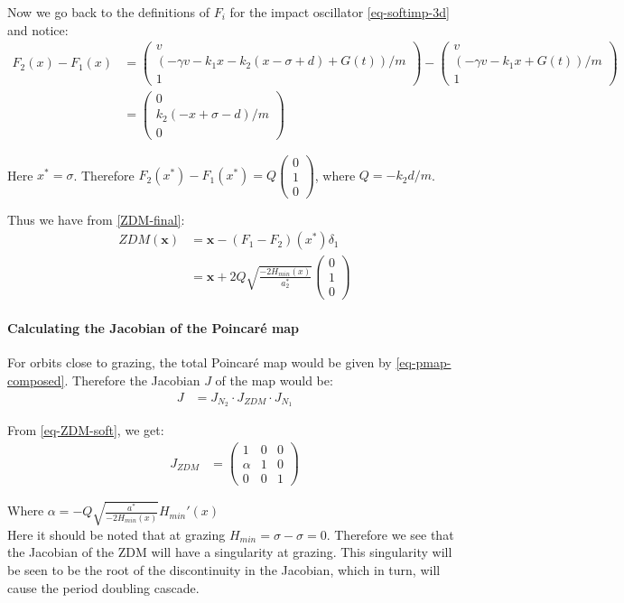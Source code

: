 \documentclass[oneside]{book}
\renewcommand{\(}{\begin{columns}}
\renewcommand{\)}{\end{columns}}
\newcommand{\<}[1]{\begin{column}{#1}}
\renewcommand{\>}{\end{column}}
\newcommand{\colvt}[3]{\begin{pmatrix}#1\\#2\\#3\end{pmatrix}}
\newcommand{\bb}[1]{\textbf{#1}}
\newcommand{\para}{\paragraph}
\begin{document}
Now we go back to the definitions of $F_i$ for the impact oscillator 
\eqref{eq-softimp-3d} and notice:
\begin{align}
F_2(x)-F_1(x)
&=
\begin{pmatrix}
v\\
(-\gamma v-k_1x-k_2(x-\sigma+d)+G(t))/m\\
1
\end{pmatrix}
-
\begin{pmatrix}
v\\
(-\gamma v-k_1x+G(t))/m\\
1
\end{pmatrix}
\\
&=
\begin{pmatrix}
0\\
k_2(-x+\sigma-d)/m\\
0
\end{pmatrix}\end{align}

Here $x^*=\sigma$.  
Therefore $F_2(x^*)-F_1(x^*)=Q\colvt{0}{1}{0}$, where $Q=-k_2d/m$.  

Thus we have from \eqref{ZDM-final}:
\begin{align}
\label{eq-ZDM-soft}
ZDM(\bb{x})&=\bb{x}-(F_1-F_2)(x^*)\delta_1\\
&=\bb{x}+2Q\sqrt{\frac{-2H_{min}(x)}{a_2^*}}\colvt{0}{1}{0}
\end{align}


\para{Calculating the Jacobian of the Poincaré map}
For orbits close to grazing, the total Poincaré map would be given by 
\eqref{eq-pmap-composed}. Therefore the Jacobian $J$ of the map would be:
\begin{align}
\label{eq-jacob-composed}
{J}&={J_{N_2}}\cdot{J_{ZDM}}\cdot{J_{N_1}}
\end{align}


From \eqref{eq-ZDM-soft}, we get:
\begin{align}
\label{eq-jacob-soft}
J_{ZDM}&=
\begin{pmatrix}
1 & 0 & 0\\
\alpha & 1 & 0\\
0 & 0 & 1
\end{pmatrix}
\end{align}

Where $\alpha=-Q\sqrt{\frac{a^*}{-2H_{min}(x)}}H_{min}'(x)$\\
Here it should be noted that at grazing 
$H_{min}=\sigma-\sigma=0$.  Therefore we see that the Jacobian of the ZDM will 
have a singularity at grazing.  This singularity will be seen to be the root 
of the discontinuity in the Jacobian, which in turn, will cause the period 
doubling cascade.  
\end{document}
